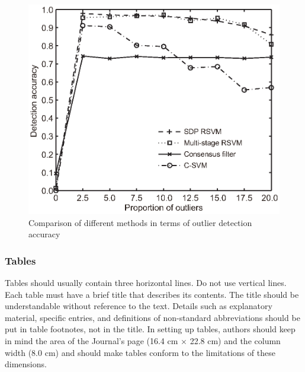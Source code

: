 \documentclass[twoside,twocolumn]{article}
\begin{document}
\begin{figure}[tbh]
	\centering
	\includegraphics[scale=0.60]{pics/outlierdetection.eps}
	\caption{Comparison of different methods in terms of outlier detection accuracy \citep{Zhou11}} \label{fig:Prediction}
\end{figure}


\subsubsection{Tables}\label{sec:table}

Tables should usually contain three horizontal lines. Do not use vertical lines. Each table must have a brief title that describes its contents. The title should be understandable without reference to the text. Details such as explanatory material, specific entries, and definitions of non-standard abbreviations should be put in table footnotes, not in the title. In setting up tables, authors should keep in mind the area of the Journal's page (16.4 cm $\times$ 22.8 cm) and the column width (8.0 cm) and should make tables conform to the limitations of these dimensions.
\end{document}

